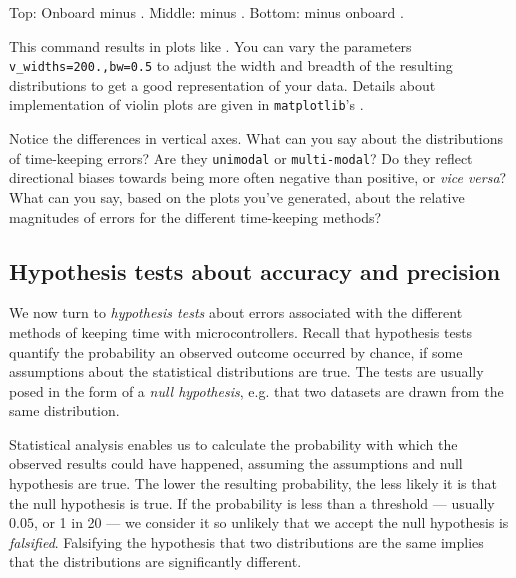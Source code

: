 \begin{enumerate}
\begin{marginfigure}[0.cm]
\begin{center}
{		Top: Onboard \rtc minus  \rtc. Middle: \ntp minus  \rtc. Bottom: \ntp minus onboard \rtc. }
	\end{center}
\end{marginfigure}
	This command results in plots like .
	You can vary the parameters \lstinline{v_widths=200.,bw=0.5} to adjust the width and breadth of the resulting distributions to get a good representation of your data.
	Details about implementation of violin plots are given in \lstinline{matplotlib}'s .
	
	Notice the differences in vertical axes. 
	What can you say about the distributions of time-keeping errors?
	Are they \texttt{unimodal} or \texttt{multi-modal}?
	Do they reflect directional biases towards being more often negative than positive, or \textit{vice versa}?
	What can you say, based on the plots you've generated, about the relative magnitudes of errors for the different time-keeping methods?
	
\end{enumerate}

\subsection{Hypothesis tests about \rtc accuracy and precision}
We now turn to \emph{hypothesis tests} about errors associated with the different methods of keeping time with microcontrollers. 
Recall that hypothesis tests quantify the probability an observed outcome occurred by chance, if some assumptions about the statistical distributions are true.
The tests are usually posed in the form of a \emph{null hypothesis}, e.g. that two datasets are drawn from the same distribution. 

Statistical analysis enables us to calculate the probability with which the observed results could have happened, assuming the assumptions and null hypothesis are true. 
The lower the resulting probability, the less likely it is that the null hypothesis is true.
If the probability is less than a threshold --- usually $0.05$, or 1 in 20 --- we consider it so unlikely that we accept the null hypothesis is \emph{falsified}.
Falsifying the hypothesis that two distributions are the same implies that the distributions are significantly different.

